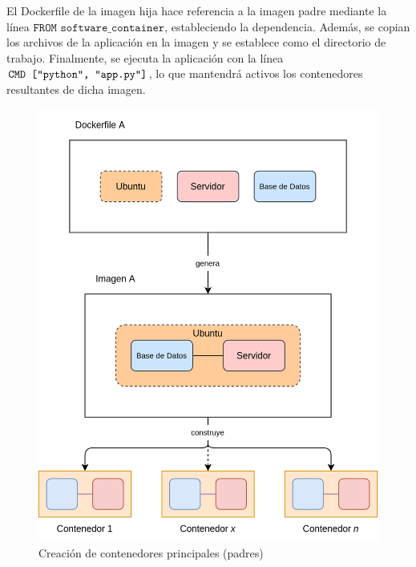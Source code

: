                 El Dockerfile de la imagen hija hace referencia a la imagen padre mediante la línea $\texttt{FROM software\_container}$, estableciendo la dependencia. Además, se copian los archivos de la aplicación en la imagen y se establece como el directorio de trabajo. Finalmente, se ejecuta la aplicación con la línea $\verb|CMD ["python", "app.py"]|$, lo que mantendrá activos los contenedores resultantes de dicha imagen.

                \begin{figure}[!htbp]
                    \centering
                    \includegraphics[scale=0.14]{images/Diagramas/Contenedor A.png}
                    \caption{Creación de contenedores principales (padres)}
                    \label{fig:contenedor-padre}
                \end{figure}
                
